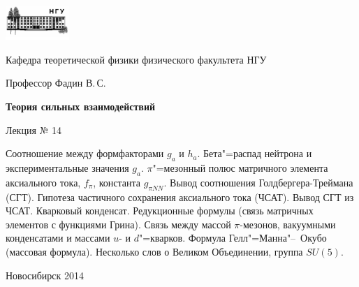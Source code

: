 \documentclass[12pt,pagesize,paper=192mm:108mm]{scrbook}
\begin{document}
\begin{titlepage}
  \vspace*{-1em}
  \begin{center}
    \includegraphics[width=0.18\textwidth]{./NSU-logo}

    Кафедра теоретической физики физического факультета НГУ
    \medskip

    \Large
    Профессор Фадин В.\,С.

    \huge
    \textbf{Теория сильных взаимодействий}
    \smallskip
    
    \Large
    Лекция № 14
    \vfill
    
    \normalsize
    \begin{minipage}{0.9\linewidth}
      Соотношение между формфакторами $g_a$ и $h_a$. Бета"=распад
      нейтрона и экспериментальные значения $g_a$. $\pi$"=мезонный
      полюс матричного элемента аксиального тока, $f_{\pi}$, константа
      $g_{\pi NN}$. Вывод соотношения Голдбергера-Треймана (СГТ). Гипотеза
      частичного сохранения аксиального тока (ЧСАТ). Вывод СГТ из
      ЧСАТ. Кварковый конденсат. Редукционные формулы (связь матричных
      элементов с функциями Грина). Связь между массой $\pi$-мезонов,
      вакуумными конденсатами и массами $u$- и $d$"=кварков. Формула
      Гелл"=Манна"--~Окубо (массовая формула). Несколько слов о Великом
      Объединении, группа $SU(5)$.
    \end{minipage}
    \vfill
    
    \normalsize \ccbysa\hspace{0.5em}  Новосибирск 2014   
  \end{center}
\end{titlepage}
\end{document}
